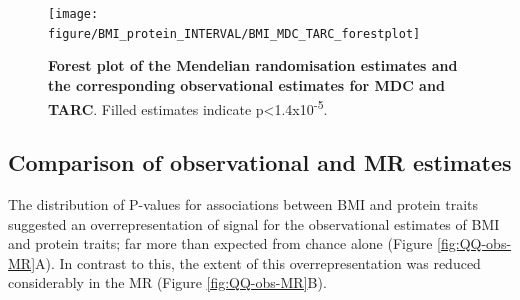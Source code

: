 \documentclass[11pt,twoside]{bristolthesis}
\begin{document}
\begin{figure}

{\centering \texttt{[image: figure/BMI\_protein\_INTERVAL/BMI\_MDC\_TARC\_forestplot]} 

}

\caption[Forest plot of the strongest BMI-protein Mendelian randomisation estimates and the corresponding observational estimates]{\textbf{Forest plot of the Mendelian randomisation estimates and the corresponding observational estimates for MDC and TARC}. Filled estimates indicate p\textless1.4x10\textsuperscript{-5}.}\label{fig:ObsMRforestplot-MDC-TARC}
\end{figure}
\hypertarget{comparison-of-observational-and-mr-estimates}{%
\subsection{Comparison of observational and MR estimates}\label{comparison-of-observational-and-mr-estimates}}

The distribution of P-values for associations between BMI and protein traits suggested an overrepresentation of signal for the observational estimates of BMI and protein traits; far more than expected from chance alone (Figure \ref{fig:QQ-obs-MR}A). In contrast to this, the extent of this overrepresentation was reduced considerably in the MR (Figure \ref{fig:QQ-obs-MR}B).
\end{document}
